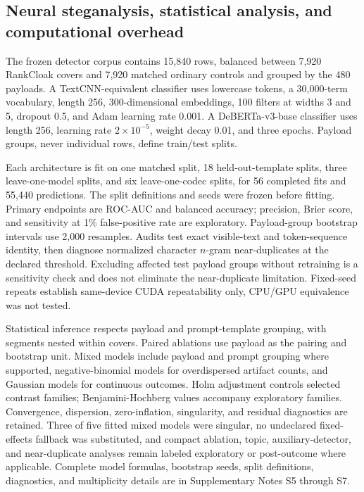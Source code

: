 \documentclass[fleqn,10pt]{wlscirep}
\begin{document}
\subsection*{Neural steganalysis, statistical analysis, and computational overhead}\label{sec:detector-method}\label{sec:statistics-method}

The frozen detector corpus contains 15,840 rows, balanced between 7,920 RankCloak covers and 7,920 matched ordinary controls and grouped by the 480 payloads. A TextCNN-equivalent classifier\cite{Kim2014CNN,Wen2019CNNTextSteganalysis} uses lowercase tokens, a 30,000-term vocabulary, length 256, 300-dimensional embeddings, 100 filters at widths 3 and 5, dropout 0.5, and Adam learning rate 0.001. A DeBERTa-v3-base classifier uses length 256, learning rate \(2\times10^{-5}\), weight decay 0.01, and three epochs\cite{He2021DeBERTa}. Payload groups, never individual rows, define train/test splits.

Each architecture is fit on one matched split, 18 held-out-template splits, three leave-one-model splits, and six leave-one-codec splits, for 56 completed fits and 55,440 predictions. The split definitions and seeds were frozen before fitting. Primary endpoints are ROC-AUC and balanced accuracy; precision, Brier score, and sensitivity at 1\% false-positive rate are exploratory. Payload-group bootstrap intervals use 2,000 resamples\cite{Efron1979Bootstrap}. Audits test exact visible-text and token-sequence identity, then diagnose normalized character \(n\)-gram near-duplicates at the declared threshold. Excluding affected test payload groups without retraining is a sensitivity check and does not eliminate the near-duplicate limitation. Fixed-seed repeats establish same-device CUDA repeatability only, CPU/GPU equivalence was not tested.

Statistical inference respects payload and prompt-template grouping, with segments nested within covers. Paired ablations use payload as the pairing and bootstrap unit. Mixed models include payload and prompt grouping where supported, negative-binomial models for overdispersed artifact counts, and Gaussian models for continuous outcomes\cite{Bates2015lme4,Brooks2017glmmTMB}. Holm adjustment controls selected contrast families; Benjamini-Hochberg values accompany exploratory families. Convergence, dispersion, zero-inflation, singularity, and residual diagnostics are retained. Three of five fitted mixed models were singular, no undeclared fixed-effects fallback was substituted, and compact ablation, topic, auxiliary-detector, and near-duplicate analyses remain labeled exploratory or post-outcome where applicable. Complete model formulas, bootstrap seeds, split definitions, diagnostics, and multiplicity details are in Supplementary Notes S5 through S7.
\end{document}
